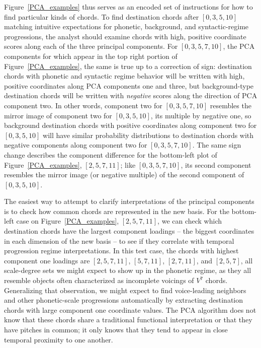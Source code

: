 Figure~\ref{PCA_examples} thus serves as an encoded set of instructions for how to find particular kinds of chords.  To find destination chords after $[0,3,5,10]$ matching intuitive expectations for phonetic, background, and syntactic-regime progressions, the analyst should examine chords with high, positive coordinate scores along each of the three principal components.  For $[0,3,5,7,10]$, the PCA components for which appear in the top right portion of Figure~\ref{PCA_examples}, the same is true up to a correction of sign: destination chords with phonetic and syntactic regime behavior will be written with high, positive coordinates along PCA components one and three, but background-type destination chords will be written with \emph{negative} scores along the direction of PCA component two.  In other words, component two for $[0,3,5,7,10]$ resembles the mirror image of component two for $[0,3,5,10]$, its multiple by negative one, so background destination chords with positive coordinates along component two for $[0,3,5,10]$ will have similar probability distributions to destination chords with negative components along component two for $[0,3,5,7,10]$.  The same sign change describes the component difference for the bottom-left plot of Figure~\ref{PCA_examples}, $[2,5,7,11]$; like $[0,3,5,7,10]$, its second component resembles the mirror image (or negative multiple) of the second component of $[0,3,5,10]$.

The easiest way to attempt to clarify interpretations of the principal components is to check how common chords are represented in the new basis.  For the bottom-left case on Figure~\ref{PCA_examples}, $[2,5,7,11]$, we can check which destination chords have the largest component loadings -- the biggest coordinates in each dimension of the new basis -- to see if they correlate with temporal progression regime interpretations.  In this test case, the chords with highest component one loadings are $[2,5,7,11]$, $[5,7,11]$, $[2,7,11]$, and $[2,5,7]$, all scale-degree sets we might expect to show up in the phonetic regime, as they all resemble objects often characterized as incomplete voicings of $V^7$ chords.  Generalizing that observation, we might expect to find voice-leading neighbors and other phonetic-scale progressions automatically by extracting destination chords with large component one coordinate values.  The PCA algorithm does not know that these chords share a traditional functional interpretation or that they have pitches in common; it only knows that they tend to appear in close temporal proximity to one another.

